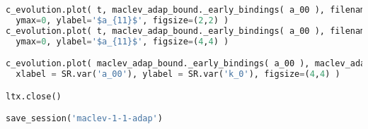 \begin{lstlisting}[language=Python]
c_evolution.plot( t, maclev_adap_bound._early_bindings( a_00 ), filename="maclev-1-1-a.svg",
  ymax=0, ylabel='$a_{11}$', figsize=(2,2) )
c_evolution.plot( t, maclev_adap_bound._early_bindings( a_00 ), filename="maclev-1-1-a.png",
  ymax=0, ylabel='$a_{11}$', figsize=(4,4) )

c_evolution.plot( maclev_adap_bound._early_bindings( a_00 ), maclev_adap_bound._early_bindings( k_0 ), filename="maclev-1-1-ak.png",
  xlabel = SR.var('a_00'), ylabel = SR.var('k_0'), figsize=(4,4) )

ltx.close()

save_session('maclev-1-1-adap')
\end{lstlisting}
